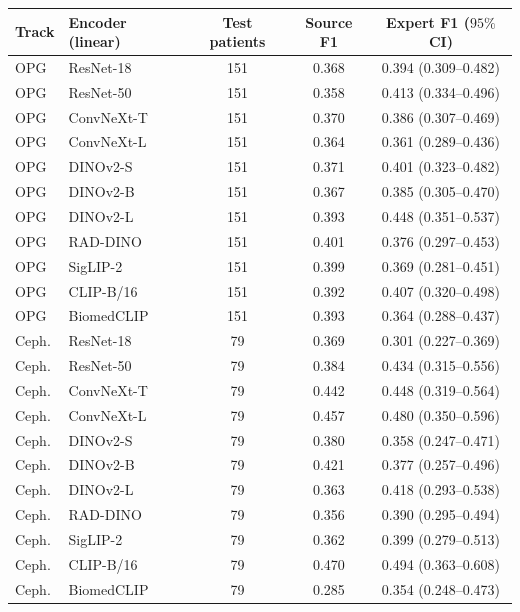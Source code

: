 \begin{tabular}{@{}llccc@{}}\toprule
Track & Encoder (linear) & Test patients & Source F1 & Expert F1 ($95\%$ CI)\\\midrule
OPG & ResNet-18 & 151 & 0.368 & 0.394 (0.309--0.482)\\
OPG & ResNet-50 & 151 & 0.358 & 0.413 (0.334--0.496)\\
OPG & ConvNeXt-T & 151 & 0.370 & 0.386 (0.307--0.469)\\
OPG & ConvNeXt-L & 151 & 0.364 & 0.361 (0.289--0.436)\\
OPG & DINOv2-S & 151 & 0.371 & 0.401 (0.323--0.482)\\
OPG & DINOv2-B & 151 & 0.367 & 0.385 (0.305--0.470)\\
OPG & DINOv2-L & 151 & 0.393 & 0.448 (0.351--0.537)\\
OPG & RAD-DINO & 151 & 0.401 & 0.376 (0.297--0.453)\\
OPG & SigLIP-2 & 151 & 0.399 & 0.369 (0.281--0.451)\\
OPG & CLIP-B/16 & 151 & 0.392 & 0.407 (0.320--0.498)\\
OPG & BiomedCLIP & 151 & 0.393 & 0.364 (0.288--0.437)\\
Ceph. & ResNet-18 & 79 & 0.369 & 0.301 (0.227--0.369)\\
Ceph. & ResNet-50 & 79 & 0.384 & 0.434 (0.315--0.556)\\
Ceph. & ConvNeXt-T & 79 & 0.442 & 0.448 (0.319--0.564)\\
Ceph. & ConvNeXt-L & 79 & 0.457 & 0.480 (0.350--0.596)\\
Ceph. & DINOv2-S & 79 & 0.380 & 0.358 (0.247--0.471)\\
Ceph. & DINOv2-B & 79 & 0.421 & 0.377 (0.257--0.496)\\
Ceph. & DINOv2-L & 79 & 0.363 & 0.418 (0.293--0.538)\\
Ceph. & RAD-DINO & 79 & 0.356 & 0.390 (0.295--0.494)\\
Ceph. & SigLIP-2 & 79 & 0.362 & 0.399 (0.279--0.513)\\
Ceph. & CLIP-B/16 & 79 & 0.470 & 0.494 (0.363--0.608)\\
Ceph. & BiomedCLIP & 79 & 0.285 & 0.354 (0.248--0.473)\\
\bottomrule\end{tabular}
